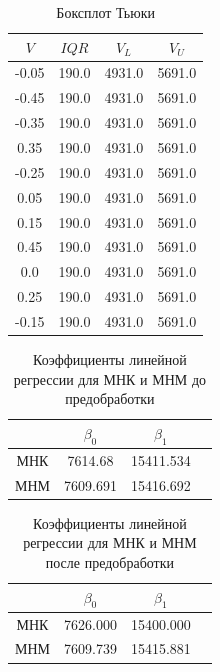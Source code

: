 \documentclass[12pt,a4paper]{article}
\begin{document}
\begin{table}[htbp]
    \centering
    \begin{tabular}{ |c|c|c|c| }
        \hline
        $V$ & $IQR$ & $V_L$ & $V_U$ \\
        \hline
        -0.05 & 190.0 & 4931.0 & 5691.0 \\
        \hline
        -0.45 & 190.0 & 4931.0 & 5691.0 \\
        \hline
        -0.35 & 190.0 & 4931.0 & 5691.0 \\
        \hline
        0.35 & 190.0 & 4931.0 & 5691.0 \\
        \hline
        -0.25 & 190.0 & 4931.0 & 5691.0 \\
        \hline
        0.05 & 190.0 & 4931.0 & 5691.0 \\
        \hline
        0.15 & 190.0 & 4931.0 & 5691.0 \\
        \hline
        0.45 & 190.0 & 4931.0 & 5691.0 \\
        \hline
        0.0 & 190.0 & 4931.0 & 5691.0 \\
        \hline
        0.25 & 190.0 & 4931.0 & 5691.0 \\
        \hline
        -0.15 & 190.0 & 4931.0 & 5691.0 \\
        \hline
    \end{tabular}
    \caption{Боксплот Тьюки}
\end{table}

\begin{table}[htbp]
    \centering
    \begin{tabular}{ |c|c|c|c| }
        \hline
         & $\beta_0$ & $\beta_1$ \\
         \hline
        МНК & 7614.68 & 15411.534 \\
        \hline
        МНМ & 7609.691 & 15416.692 \\
        \hline
    \end{tabular}
    \caption{Коэффициенты линейной регрессии для МНК и МНМ до предобработки}
\end{table}

\begin{table}[htbp]
    \centering
    \begin{tabular}{ |c|c|c|c| }
        \hline
         & $\beta_0$ & $\beta_1$ \\
         \hline
        МНК & 7626.000 & 15400.000 \\
        \hline
        МНМ & 7609.739 & 15415.881 \\
        \hline
    \end{tabular}
    \caption{Коэффициенты линейной регрессии для МНК и МНМ после предобработки}
\end{table}
\end{document}
